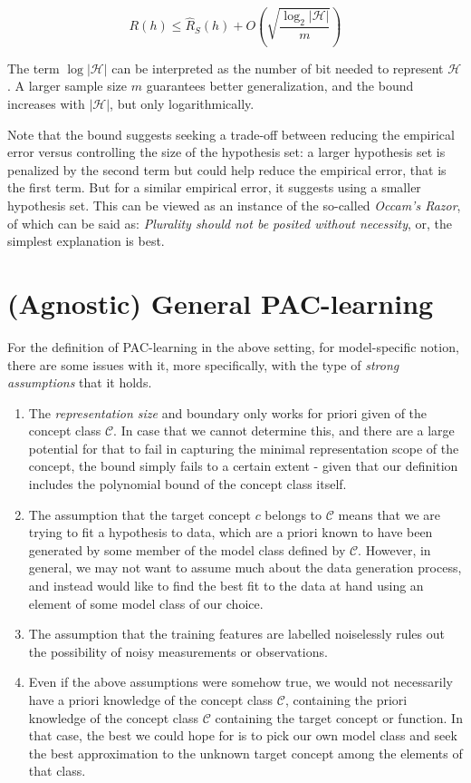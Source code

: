 \begin{equation*}
    R(h) \leq \hat{R}_S (h) + O \left( \sqrt{\frac{\log_{2}{|\mathcal{H}|}}{m}} \right)
\end{equation*}

The term $\log{|\mathcal{H}|}$ can be interpreted as the number of bit needed to represent $\mathcal{H}$. A larger sample size $m$ guarantees better generalization, and the bound increases with $|\mathcal{H}|$, but only logarithmically. 

Note that the bound suggests seeking a trade-off between reducing the empirical error versus controlling the size of the hypothesis set: a larger hypothesis set is penalized by the second term but could help reduce the empirical error, that is the first term. But for a similar empirical error, it suggests using a smaller hypothesis set. This can be viewed as an instance of the so-called \textit{Occam's Razor}, of which can be said as: \textit{Plurality should not be posited without necessity}, or, the simplest explanation is best.

\section{(Agnostic) General PAC-learning}

For the definition of PAC-learning in the above setting, for model-specific notion, there are some issues with it, more specifically, with the type of \textit{strong assumptions} that it holds. 
\begin{enumerate}[noitemsep,topsep=1pt]
    \item The \textit{representation size} and boundary only works for priori given of the concept class $\mathcal{C}$. In case that we cannot determine this, and there are a large potential for that to fail in capturing the minimal representation scope of the concept, the bound simply fails to a certain extent - given that our definition includes the polynomial bound of the concept class itself. 
    \item The assumption that the target concept $c$ belongs to $\mathcal{C}$ means that we are trying to fit a hypothesis to data, which are a priori known to have been generated by some member of the model class defined by $\mathcal{C}$. However, in general, we may not want to assume much about the data generation process, and instead would like to find the best fit to the data at hand using an element of some model class of our choice. 
    \item The assumption that the training features are labelled noiselessly rules out the possibility of noisy measurements or observations. 
    \item Even if the above assumptions were somehow true, we would not necessarily have a priori knowledge of the concept class $\mathcal{C}$, containing the priori knowledge of the concept class $\mathcal{C}$ containing the target concept or function. In that case, the best we could hope for is to pick our own model class and seek the best approximation to the unknown target concept among the elements of that class. 
\end{enumerate}

